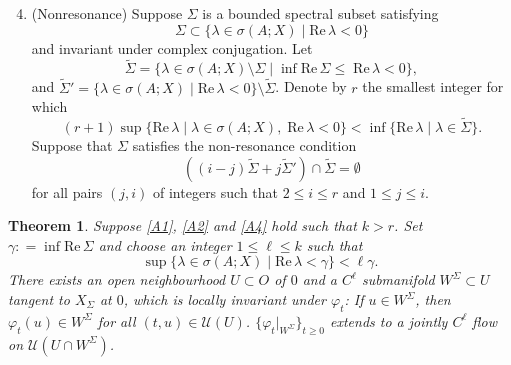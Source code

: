 \documentclass[a4paper, 12pt, oneside, reqno, notitlepage]{amsart}
\theoremstyle{plain}
\newtheorem{theorem}{Theorem}
\theoremstyle{definition}
\theoremstyle{remark}
\begin{document}
\begin{enumerate}[label =(A.\arabic*)]
    \setcounter{enumi}{3}
    \item \label{A4} (Nonresonance) Suppose $\Sigma$ is a bounded spectral subset satisfying
    \begin{displaymath}
         \Sigma \subset \{ \lambda \in \sigma(A;X) \; | \; \mathrm{Re} \, \lambda < 0 \}
    \end{displaymath}
    and invariant under complex conjugation. 
    Let 
    \begin{displaymath}
        \widetilde{\Sigma} = \{ \lambda \in \sigma(A;X) \setminus \Sigma \; | \; \inf \mathrm{Re} \, \Sigma \leq \; \mathrm{Re} \, \lambda < 0 \},
    \end{displaymath}
    and $\widetilde{\Sigma}' = \{ \lambda \in \sigma(A;X) \; | \; \mathrm{Re} \, \lambda < 0 \} \setminus \widetilde{\Sigma}$.
    Denote by $r$ the smallest integer for which 
    \begin{displaymath}
        (r+1) \sup \{ \mathrm{Re} \, \lambda \; | \; \lambda \in \sigma(A;X), \; \mathrm{Re} \, \lambda < 0 \} < \inf \{ \mathrm{Re} \, \lambda \; | \; \lambda \in  \widetilde{\Sigma} \}.
    \end{displaymath}
    Suppose that $\Sigma$ satisfies the non-resonance condition
    \begin{displaymath}
   \left( (i-j) \widetilde{\Sigma} +
    j \widetilde{\Sigma}' \right) \cap \widetilde{\Sigma} = \emptyset
    \end{displaymath}
    for all pairs $(j,i)$ of integers such that $2 \leq i \leq r$ and $1 \leq j \leq i$.
\end{enumerate}

\begin{theorem} \label{thm:main2}
    Suppose \ref{A1}, \ref{A2} and \ref{A4} hold such that $k > r$.
        Set $\gamma : = \inf \mathrm{Re} \, \Sigma$ and choose an integer $1 \leq \ell  \leq k$ such that 
    \begin{displaymath}
        \sup \{ \lambda \in \sigma(A;X) \; | \; \mathrm{Re} \, \lambda < \gamma \} < \ell \gamma.
    \end{displaymath}
    There exists an open neighbourhood $U \subset O$ of $0$ and a $C^\ell$  submanifold $W^\Sigma \subset U$ tangent to $X_\Sigma$ at $0$, which is locally invariant under $\varphi_t$: If $u \in W^\Sigma$, then $\varphi_t(u) \in W^\Sigma$ for all $(t,u) \in \mathcal{U}(U)$.
    $\{\varphi_t|_{W^\Sigma} \}_{t \geq 0}$ extends to a jointly $C^\ell$ flow on $\mathcal{U}(U \cap W^\Sigma)$.
\end{theorem}
\end{document}
